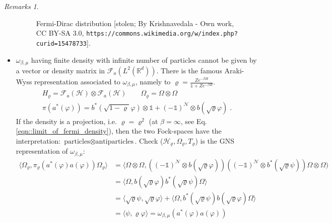 \documentclass[
a4paper, %
11pt, %
onecolumn, %
openany, %
]{memoir}
\theoremstyle{definition}
\theoremstyle{remark}
\newtheorem{remarks}{Remarks}[chapter]
\theoremstyle{plain}
\begin{document}
\begin{remarks}
\begin{itemize}
\begin{figure}
		 	\caption{Fermi-Dirac distribution [stolen; By Krishnavedala - Own work, CC BY-SA 3.0, \texttt{https://commons.wikimedia.org/w/index.php?curid=15478733}]\label{fermidirac}.}
		 \end{figure}
	 \item $\omega_{\beta,\mu}$ having finite density with infinite number of particles cannot be given by a vector or density matrix in $\mathcal{F}_a(L^2(\mathbb{R}^d))$. There is the famous Araki-Wyss representation associated to $\omega_{\beta,\mu}$, namely to $\varrho=\frac{Ze^{-\beta H}}{\mathds{1}+Ze^{-\beta H}}$. \begin{align}
	 H_{\varrho}=\mathcal{F}_a (\mathcal{H}) \otimes \mathcal{F}_a(\mathcal{H}) \qquad \Omega_{\varrho}=\Omega\otimes\Omega \\
	 \pi(a^*(\varphi))=b^*(\sqrt{1-\varrho}\varphi)\otimes \mathds{1}+(-\mathds{1})^{\mathcal{N}}\otimes b(\sqrt{\varrho}\varphi)\; .
	 \end{align}
	 If the density is a projection, i.e. $\varrho=\varrho^2$ (at $\beta=\infty$, see Eq. \eqref{eqn::limit_of_fermi_density}), then the two Fock-spaces have the interpretation: $\text{particles}\otimes\text{antiparticles}$. Check ($\mathcal{H}_\varrho,\Omega_{\varrho},T_{\varrho}$) is the GNS representation of $\omega_{\beta,\mu}$: \begin{align}
	 \langle \Omega_{\varrho},\pi_{\varrho}(a^*(\varphi)a(\varphi))\Omega_{\varrho}\rangle&=\langle \Omega\otimes \Omega,\left((-\mathds{1})^{\mathcal{N}}\otimes b(\sqrt{\varrho}\varphi)\right)\left((-\mathds{1})^{\mathcal{N}}\otimes b^*(\sqrt{\varrho}\psi)\right)\Omega\otimes \Omega)\\
	 &=\langle \Omega,b(\sqrt{\varrho}\varphi)b^*(\sqrt{\varrho}\psi)\Omega\rangle\\
	 &=\langle \sqrt{\varrho}\psi,\sqrt{\varrho}\varphi\rangle+\langle \Omega ,b^*(\sqrt{\varrho}\psi)b(\sqrt{\varrho}\varphi)\Omega\rangle\\
	 &=\langle \psi,\varrho\varphi\rangle=\omega_{\beta,\mu}(a^*(\varphi)a(\varphi))
	 \end{align}
	\end{itemize}
\end{remarks}
\end{document}
